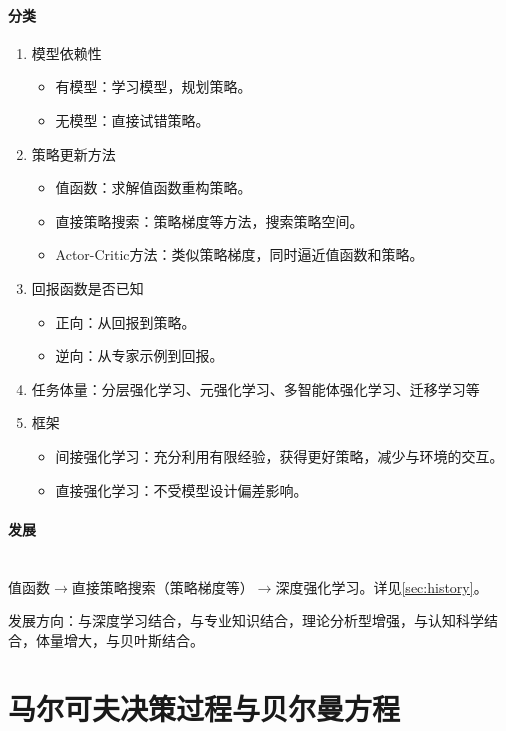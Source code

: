 \documentclass[
12pt, %
a4paper, 
oneside, %
headinclude,footinclude, %
]{scrartcl}
\begin{document}
\paragraph{分类}
\begin{enumerate}
\item 模型依赖性
\begin{itemize}
\item 有模型：学习模型，规划策略。
\item 无模型：直接试错策略。
\end{itemize}
\item 策略更新方法
\begin{itemize}
\item 值函数：求解值函数重构策略。
\item 直接策略搜索：策略梯度等方法，搜索策略空间。
\item Actor-Critic方法：类似策略梯度，同时逼近值函数和策略。
\end{itemize}
\item 回报函数是否已知
\begin{itemize}
\item 正向：从回报到策略。
\item 逆向：从专家示例到回报。
\end{itemize}
\item 任务体量：分层强化学习、元强化学习、多智能体强化学习、迁移学习等
\item 框架
\begin{itemize}
\item 间接强化学习：充分利用有限经验，获得更好策略，减少与环境的交互。
\item 直接强化学习：不受模型设计偏差影响。
\end{itemize}
\end{enumerate}
\paragraph{发展}\label{sec:history back}~\\

值函数$ \rightarrow $直接策略搜索（策略梯度等）$ \rightarrow $深度强化学习。详见\ref{sec:history}。

发展方向：与深度学习结合，与专业知识结合，理论分析型增强，与认知科学结合，体量增大，与贝叶斯结合。
\section{马尔可夫决策过程与贝尔曼方程}
\end{document}
